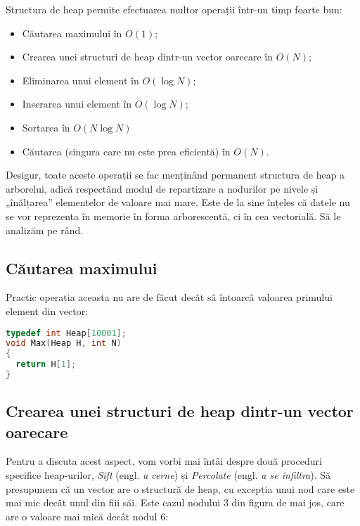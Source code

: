 Structura de heap permite efectuarea multor operații într-un timp foarte bun:

\begin{itemize}
  \item Căutarea maximului în $O(1)$;
  \item Crearea unei structuri de heap dintr-un vector oarecare în $O(N)$;
  \item Eliminarea unui element în $O(\log N)$;
  \item Inserarea unui element în $O(\log N)$;
  \item Sortarea în $O(N \log N)$
  \item Căutarea (singura care nu este prea eficientă) în $O(N)$.
\end{itemize}

Desigur, toate aceste operații se fac menținând permanent structura de heap a
arborelui, adică respectând modul de repartizare a nodurilor pe nivele și
„înălțarea” elementelor de valoare mai mare. Este de la sine înțeles că datele
nu se vor reprezenta în memorie în forma arborescentă, ci în cea
vectorială. Să le analizăm pe rând.

\subsection{Căutarea maximului}

Practic operația aceasta nu are de făcut decât să întoarcă valoarea primului
element din vector:

\begin{lstlisting}[language=C]
typedef int Heap[10001];
void Max(Heap H, int N)
{
  return H[1];
}
\end{lstlisting}

\subsection{Crearea unei structuri de heap dintr-un vector oarecare}

Pentru a discuta acest aspect, vom vorbi mai întâi despre două proceduri
specifice heap-urilor, {\it Sift} (engl. {\it a cerne}) și {\it Percolate}
(engl. {\it a se infiltra}). Să presupunem că un vector are o structură de
heap, cu excepția unui nod care este mai mic decât unul din fiii săi. Este
cazul nodului 3 din figura de mai jos, care are o valoare mai mică decât nodul
6:


